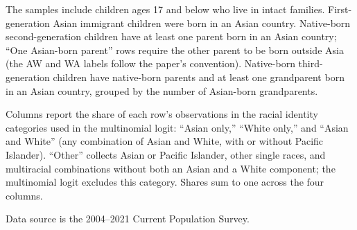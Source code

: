 \documentclass[12pt,english]{article}
\providecommand{\DIFaddtex}[1]{{\protect\color{blue}\uwave{#1}}} %
\providecommand{\DIFaddend}{} %
\providecommand{\DIFaddFL}[1]{\DIFadd{#1}} %
\providecommand{\DIFadd}[1]{\texorpdfstring{\DIFaddtex{#1}}{#1}} %
\DeclareRobustCommand{\DIFaddend}{\DIFOaddend \let\includegraphics\DIFOincludegraphics} %
\begin{document}
\begin{table}[H]
\begin{threeparttable}
\begin{tabular}{lccccc}
\bottomrule
\end{tabular}
\begin{tablenotes}
\small
\item[\DIFaddFL{1}] The samples include children ages 17 and below who live in intact families. First-generation Asian immigrant children were born in an Asian country. Native-born second-generation children have at least one parent born in an Asian country; ``One Asian-born parent'' rows require the other parent to be born outside Asia (the AW and WA labels follow the paper's convention). Native-born third-generation children have native-born parents and at least one grandparent born in an Asian country, grouped by the number of Asian-born grandparents.
\item[\DIFaddFL{2}] Columns report the share of each row's observations in the racial identity categories used in the multinomial logit: ``Asian only,'' ``White only,'' and ``Asian and White'' (any combination of Asian and White, with or without Pacific Islander). ``Other'' collects Asian or Pacific Islander, other single races, and multiracial combinations without both an Asian and a White component; the multinomial logit excludes this category. Shares sum to one across the four columns.
\item[\DIFaddFL{3}] Data source is the 2004--2021 Current Population Survey.
\end{tablenotes}
\end{threeparttable}
\end{table}
\DIFaddend 


\newpage
\pagebreak
\end{document}
